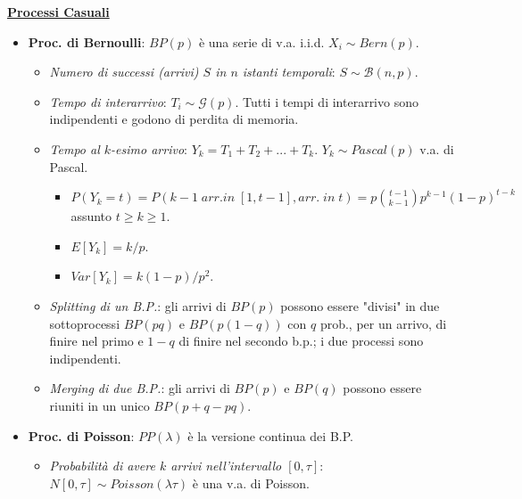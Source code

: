 \documentclass[8pt]{extarticle}
\begin{document}
\begin{multicols*}{3}
    \textbf{\underline{Processi Casuali}}
    \begin{itemize}
        \item \textbf{Proc. di Bernoulli}: $BP(p)$ è una serie di v.a. i.i.d. $X_{i}\sim Bern(p)$.
              \begin{itemize}
                  \item \textit{Numero di successi (arrivi) $S$ in $n$ istanti temporali}: $S\sim\mathcal{B}(n,p)$.
                  \item \textit{Tempo di interarrivo}: $T_{i}\sim\mathcal{G}(p)$. Tutti i tempi di interarrivo sono indipendenti e godono di perdita di memoria.
                  \item \textit{Tempo al $k$-esimo arrivo}: $Y_{k}=T_{1}+T_{2}+...+T_{k}$. $Y_{k}\sim Pascal(p)$ v.a. di Pascal.
                        \begin{itemize}
                            \item $P(Y_{k}=t)=P(k-1\; arr. in\; [1, t-1], arr.\; in\; t)=p\binom{t-1}{k-1}p^{k-1}(1-p)^{t-k}$ assunto $t\ge k\ge 1$.
                            \item $E[Y_{k}]=k/p$.
                            \item $Var[Y_{k}]=k(1-p)/p^{2}$.
                        \end{itemize}
                  \item \textit{Splitting di un B.P.}: gli arrivi di $BP(p)$ possono essere "divisi" in due sottoprocessi $BP(pq)$ e $BP(p(1-q))$ con $q$ prob., per un arrivo, di finire nel primo e $1-q$ di finire nel secondo b.p.; i due processi sono indipendenti.
                  \item \textit{Merging di due B.P.}: gli arrivi di $BP(p)$ e $BP(q)$ possono essere riuniti in un unico $BP(p+q-pq)$.
              \end{itemize}
        \item \textbf{Proc. di Poisson}: $PP(\lambda)$ è la versione continua dei B.P.
              \begin{itemize}
                  \item \textit{Probabilità di avere $k$ arrivi nell'intervallo $[0, \tau]$}:  $N[0, \tau]\sim Poisson(\lambda\tau)$ è una v.a. di Poisson.
\end{itemize}
\end{itemize}
\end{multicols*}
\end{document}
